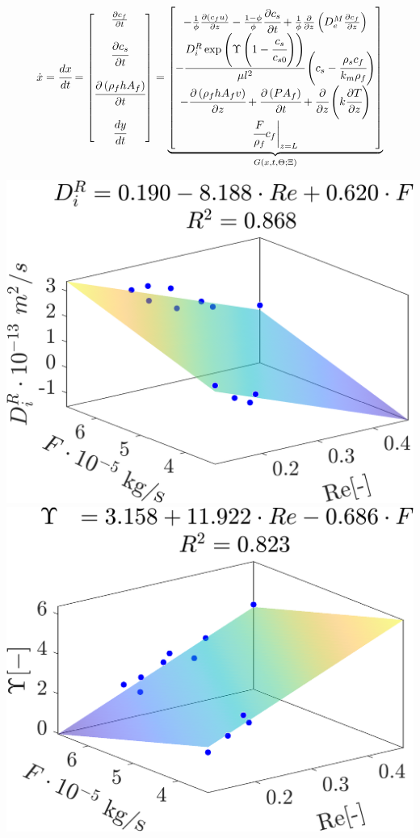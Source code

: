 \documentclass[a0,portrait]{a0poster}
\begin{document}
\begin{multicols}{2}
\begin{tcolorbox}[width=\linewidth, boxrule=0mm, sharp corners=all, colback=white]
\begin{align*}
	\dot{x} = \cfrac{d x}{d t} = 
	\begin{bmatrix}
		\frac{\partial c_f}{\partial t} \\
		\\
		\cfrac{\partial c_s}{\partial t} \\
		\\
		\cfrac{\partial \left(\rho_f h A_f\right)}{\partial t} \\
		\\
		\cfrac{d y}{d t}
	\end{bmatrix}
	=
\underbrace{\begin{bmatrix}
		-\frac{1}{\phi} \frac{\partial \left( c_f u\right)}{\partial z} - \frac{1-\phi}{\phi} \cfrac{\partial c_s}{\partial t} + \frac{1}{\phi} \frac{\partial}{\partial z} \left( D^M_e \frac{\partial c_f}{\partial z} \right) \\
		-\cfrac{ D_i^R \exp \left( \Upsilon \left( 1-\cfrac{ c_s }{c_{s0}} \right) \right) }{ \mu l^2 } \left( c_s  - \cfrac{\rho_s c_f }{ k_m \rho_f }  \right) \\
		- \cfrac{\partial \left( \rho_f h A_f v \right)}{\partial z} + \cfrac{\partial \left(P A_f\right)}{\partial t} + \cfrac{\partial}{\partial z} \left( k \cfrac{\partial T}{\partial z} \right) \\
		\cfrac{F}{\rho_f} c_f \biggr\rvert_{z=L}
	\end{bmatrix}}_{G(x,t,\Theta;\Xi)}
\end{align*}

\begin{center}\vspace{0.5cm}
	\includegraphics[width=0.49\linewidth]{Di_Re_F.png}
	\hfill
	\includegraphics[width=0.49\linewidth]{Gamma_Re_F.png}
\end{center}%


\end{tcolorbox}
\end{multicols}
\end{document}
